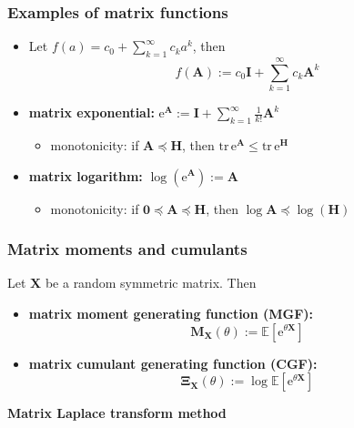 \documentclass[compress,
mathserif,wide,%
]{beamer}
\begin{document}
\begin{frame}
\frametitle{Examples of matrix functions}  

\begin{itemize}
	\itemsep1em
	\item Let $f(a)=c_0 + \sum_{k=1}^{\infty} c_k a^k$, then
	\[
		f(\bm{A}) := c_0 \bm{I} + \sum_{k=1}^{\infty} c_k {\bm A}^k
	\]
	\item {\bf matrix exponential:} $\mathrm{e}^{\bm{A}} := \bm{I} + \sum_{k=1}^{\infty} \frac{1}{k!} \bm{A}^k$ \quad {}

	\begin{itemize}
		\item monotonicity: if $\bm{A}\preceq \bm{H}$, then $\mathrm{tr}\,\mathrm{e}^{\bm{A}} \leq \mathrm{tr}\,\mathrm{e}^{\bm{H}}$
	\end{itemize}


	\item {\bf matrix logarithm:} $\log (\mathrm{e}^{\bm{A}} ) := \bm{A}$
		
	\begin{itemize}
		\item monotonicity: if $\bm{0}\preceq \bm{A}\preceq \bm{H}$, then $\log {\bm{A}} \preceq \log (\bm{H})$
	\end{itemize}


\end{itemize}

\end{frame}


\begin{frame}
\frametitle{Matrix moments and cumulants}  

	Let $\bm{X}$ be a random symmetric matrix. Then

	\begin{itemize}
		\item {\bf matrix moment generating function (MGF):} 
		\[
			\bm{M}_{\bm{X}}(\theta) := \mathbb{E}[\mathrm{e}^{\theta\bm{X}}]
		\]
	\item {\bf matrix cumulant generating function (CGF):} 
		\[
			\bm{\Xi}_{\bm{X}}(\theta) := \log \mathbb{E}[\mathrm{e}^{\theta\bm{X}}]
		\]
		

	
	\end{itemize}


\end{frame}




\begin{frame}[plain]

\vfill
\begin{center}
  {\Large\bf Matrix Laplace transform method}
\end{center}

\vfill

\end{frame}
\end{document}
